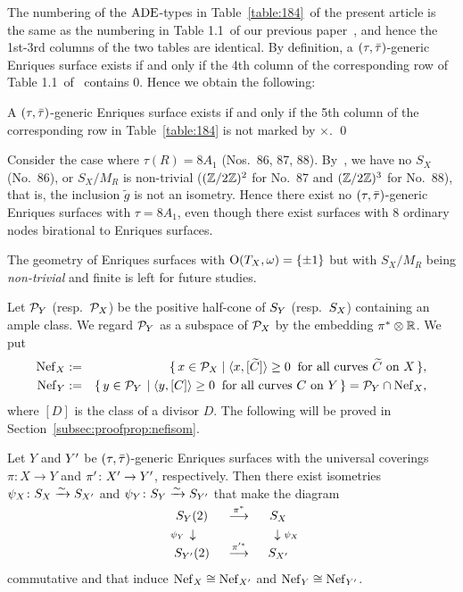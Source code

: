 \documentclass{amsart}
\numberwithin{procedure}{section}
\begin{document}
%
The numbering of the $\mathord{\rm ADE}$-types in Table~\ref{table:184}~of the present article 
is the same as the numbering in Table 1.1~of our previous paper~\cite{RDPEnriques}, and hence
the 1st-3rd columns of the two tables 
are identical.
By definition, a $(\tau, \bar{\tau})$-generic Enriques surface exists 
if and only if the 4th column of the corresponding row of 
Table 1.1~of~\cite{RDPEnriques} contains $0$.
Hence we obtain the following:
%
\begin{proposition}\label{prop:5th}
A $(\tau, \bar{\tau})$-generic Enriques surface exists 
if and only if the 5th column of 
the corresponding row in Table~\ref{table:184}
is not marked by $\times$.
\qed
\end{proposition}
%
%
\begin{example}\label{example:8A1}
Consider the case 
where $\tau(R)=8 A_1$ (Nos.~86, 87, 88).
By~\cite{RDPEnriques},
we have no $S_X$ (No.~86),
or $S_X/M_R$ is non-trivial ($(\mathord{\mathbb Z}/2\mathord{\mathbb Z})^2$ for No.~87 and $(\mathord{\mathbb Z}/2\mathord{\mathbb Z})^3$ for No.~88), 
that is, the inclusion $\tilde{g}$ is not an isometry.
Hence there  exist no $(\tau, \bar{\tau})$-generic Enriques surfaces with $\tau=8A_1$,
even though there exist surfaces with $8$ ordinary nodes birational to Enriques surfaces.
\end{example}
%
\begin{remark}
The geometry of Enriques surfaces with $\mathord{\mathrm{O}}(T_X, \omega)=\{\pm 1\}$  but  
with $S_X/M_R$ being \emph{non-trivial} and finite is left for future studies.
\end{remark}
%
Let $\mathord{\mathcal P}_Y$ (resp.~$\mathord{\mathcal P}_X$)
be the positive half-cone of $S_{Y}$
(resp.~$S_{X}$)
containing an ample class.
We regard $\mathord{\mathcal P}_Y$ as a subspace of $\mathord{\mathcal P}_X$ by
the embedding $\pi^*\otimes\mathord{\mathbb R}$.
We  put
%
\begin{eqnarray*}
\mathord{\rm Nef}_{X}&:=&
\{\,{x\in \mathord{\mathcal P}_X}\mid {\langle x, [\widetilde{C}] \rangle\ge 0 \;\;
\textrm{for all curves $\widetilde{C}$ on $X$}} \,\}, \\
\mathord{\rm Nef}_{Y}&:=&
\{\,{y\in \mathord{\mathcal P}_Y\hskip 1pt}\mid {\langle y, [C] \rangle\ge 0 \;\;\textrm{for all curves $C$ on $Y$}} \,\}=
\mathord{\mathcal P}_Y\cap \mathord{\rm Nef}_{X},
\end{eqnarray*}
%
where $[D]$ is the class of a divisor $D$.
The following will be proved in Section~\ref{subsec:proofprop:nefisom}.
%
\begin{proposition}\label{prop:nefisom}
Let $Y$ and $Y\sp\prime$  be $(\tau, \bar{\tau})$-generic Enriques surfaces
with the universal coverings $\pi\colon X\to Y$ and $\pi\sp\prime\colon X\sp\prime\to Y\sp\prime$,
respectively.
Then there exist isometries $\psi_X\colon S_{X}\xrightarrow{\sim} S_{X\sp\prime}$ and 
$\psi_Y\colon S_{Y}\xrightarrow{\sim} S_{Y\sp\prime}$
that make the diagram
%
\begin{equation}\label{eq:nefisomdiagram}
\begin{array}{ccc}
\SY(2)& \maprightsp{\pi^*} & \SX \\
\mapdownleft{\psi_Y} & &\mapdownright{\psi_X}\\
S_{Y\sprime} (2) & \maprightsp{\pi^{\prime*}}& S_{X\sprime} 
\end{array}
\end{equation}
%
commutative and that induce $\mathord{\rm Nef}_{X}\cong \mathord{\rm Nef}_{X\sp\prime}$ and $\mathord{\rm Nef}_{Y}\cong \mathord{\rm Nef}_{Y\sp\prime}$.
\end{proposition}
\end{document}
